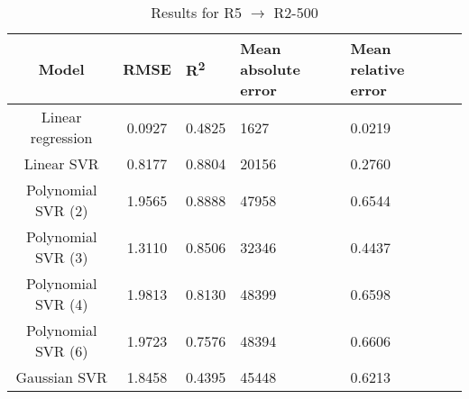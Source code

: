 \begin{table}[H]
\centering
\begin{adjustbox}{center}
\begin{tabular}{c | c M{1.2cm} M{2.5cm} M{2.5cm} M{1.8cm}}
Model & RMSE & R\textsuperscript{2} & Mean absolute error & Mean relative error \tabularnewline
\hline
Linear regression & 0.0927 & 0.4825 &   1627 & 0.0219 \\
Linear SVR & 0.8177 & 0.8804 &  20156 & 0.2760 \\
Polynomial SVR (2) & 1.9565 & 0.8888 &  47958 & 0.6544 \\
Polynomial SVR (3) & 1.3110 & 0.8506 &  32346 & 0.4437 \\
Polynomial SVR (4) & 1.9813 & 0.8130 &  48399 & 0.6598 \\
Polynomial SVR (6) & 1.9723 & 0.7576 &  48394 & 0.6606 \\
Gaussian SVR & 1.8458 & 0.4395 &  45448 & 0.6213 \\
\end{tabular}
\end{adjustbox}
\\
\caption{Results for R5 $\rightarrow$ R2-500}
\label{tab:coreonly_linear_R5_R2_500}
\end{table}
